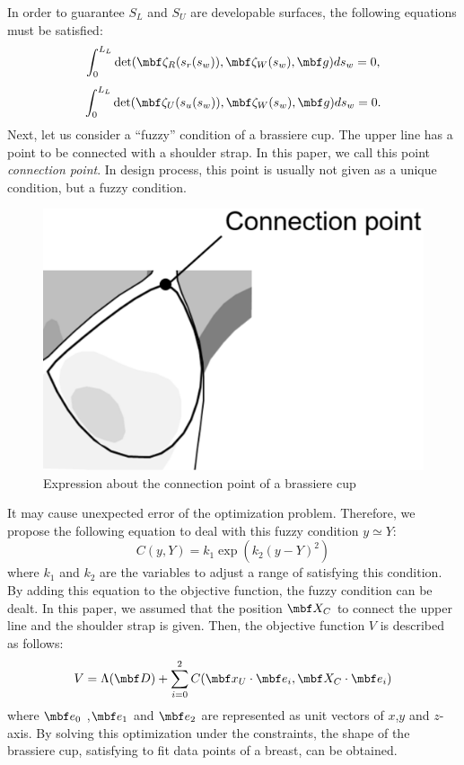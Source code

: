 \documentclass[E]{scitrans}
\begin{document}
In order to guarantee $ S_L $ and $ S_U $  are developable surfaces, the following equations must be satisfied:
\begin{equation}\label{eq:conds_DevSur1}
	\int_{0}^{L_L} \det (\zetavec_R(s_r(s_w)), \zetavec_W(s_w), \mbold{g}) ds_w = 0,
\end{equation}
\begin{equation}\label{eq:conds_DevSur2}
	\int_{0}^{L_L} \det (\zetavec_U(s_u(s_w)), \zetavec_W(s_w), \mbold{g}) ds_w = 0.
\end{equation}
Next, let us consider a “fuzzy” condition of a brassiere cup. 
The upper line has a point to be connected with a shoulder strap. In this paper, we call this point \textit{connection point}. In design process, this point is usually not given as a unique condition, but a fuzzy condition.
\begin{figure}[!h]
	\centering
	\includegraphics[width = 0.7\columnwidth]{./figure/Connection_Point.eps}
	\caption{Expression about the connection point of a brassiere cup}
	\label{fig:aboutCP}
\end{figure}
It may cause unexpected error of the optimization problem. Therefore, we propose the following equation to deal with this fuzzy condition $ y \simeq Y $:
\begin{equation}\label{eq:FuzzyEq}
C(y,Y) = k_1 \exp( k_2(y-Y)^2 )
\end{equation}
where $ k_1 $ and $ k_2 $ are the variables to adjust a range of satisfying this condition. By adding this equation to the objective function, the fuzzy condition can be dealt. In this paper, we assumed that the position $ \mbold{X}_C $ to connect the upper line and the shoulder strap is given. Then, the objective function $ V $ is described as follows:
\begin{equation}\label{eq:ObjectFunc}
V = \Lambda(\mbold{D}) + \sum_{i=0}^{2} C(\mbold{x}_U \cdot \mbold{e}_i , \mbold{X}_C \cdot \mbold{e}_i)
\end{equation}
where $\mbold{e}_0 $ ,$\mbold{e}_1 $ and $\mbold{e}_2 $ are represented as unit vectors of $ x $,$ y $ and $ z $-axis. By solving this optimization under the constraints, the shape of the brassiere cup, satisfying to fit data points of a breast, can be obtained.
\end{document}

